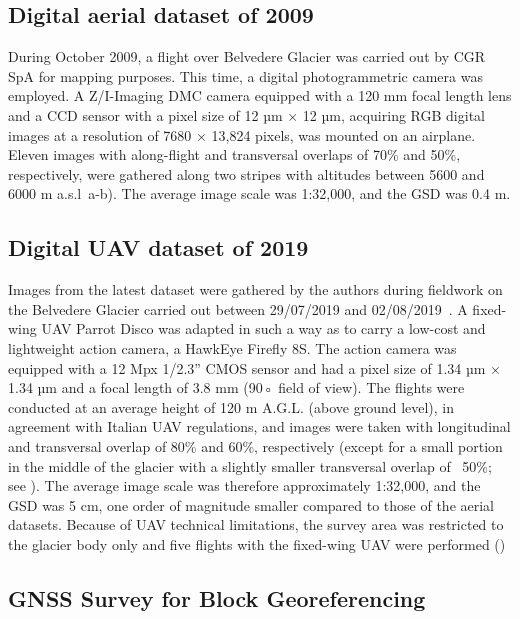 \subsection{Digital aerial dataset of 2009}

During October 2009, a flight over Belvedere Glacier was carried out by CGR SpA for mapping purposes. 
This time, a digital photogrammetric camera was employed.
A Z/I-Imaging DMC camera equipped with a 120 mm focal length lens and a CCD
sensor with a pixel size of 12 µm × 12 µm, acquiring RGB digital images at a resolution of
7680 × 13,824 pixels, was mounted on an airplane. 
Eleven images with along-flight and transversal overlaps of 70\% and 50\%, respectively, were gathered along two stripes with altitudes between 5600 and 6000 m a.s.l~a-b). 
The average image scale was 1:32,000, and the GSD was 0.4 m.

\subsection{Digital UAV dataset of 2019}

Images from the latest dataset were gathered by the authors during fieldwork on the
Belvedere Glacier carried out between 29/07/2019 and 02/08/2019~\citep{Ioli2022}. 
A fixed-wing UAV Parrot Disco was adapted in such a way as to carry a low-cost and lightweight action
camera, a HawkEye Firefly 8S. 
The action camera was equipped with a 12 Mpx 1/2.3” CMOS sensor and had a pixel size of 1.34 µm × 1.34 µm and a focal length of 3.8 mm (90◦ field of view). 
The flights were conducted at an average height of 120 m A.G.L. (above ground level), in agreement with Italian UAV regulations, and images were taken with longitudinal and transversal overlap of 80\% and 60\%, respectively (except for a small portion in the middle of the glacier with a slightly smaller transversal overlap of ~50\%; see ).
The average image scale was therefore approximately 1:32,000, and the GSD was 5 cm, one order of magnitude smaller compared to those of the aerial datasets. 
Because of UAV technical limitations, the survey area was restricted to the glacier body only and five flights with the fixed-wing UAV were performed ()


\subsection{GNSS Survey for Block Georeferencing}

